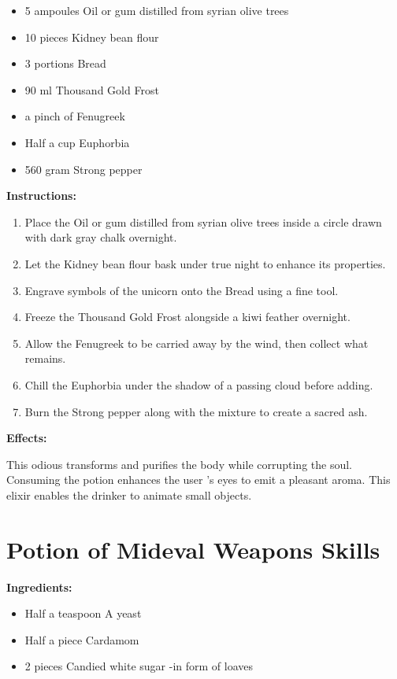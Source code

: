 \documentclass{article}
\begin{document}
\begin{itemize}
  \item 5 ampoules Oil or gum distilled from syrian olive trees
  \item 10 pieces Kidney bean flour
  \item 3 portions Bread
  \item 90 ml Thousand Gold Frost
  \item a pinch of Fenugreek
  \item Half a cup Euphorbia
  \item 560 gram Strong pepper
\end{itemize}

\textbf{Instructions:}

\begin{enumerate}
  \item Place the Oil or gum distilled from syrian olive trees inside a circle drawn with dark gray chalk overnight.
  \item Let the Kidney bean flour bask under true night to enhance its properties.
  \item Engrave symbols of the unicorn onto the Bread using a fine tool.
  \item Freeze the Thousand Gold Frost alongside a kiwi feather overnight.
  \item Allow the Fenugreek to be carried away by the wind, then collect what remains.
  \item Chill the Euphorbia under the shadow of a passing cloud before adding.
  \item Burn the Strong pepper along with the mixture to create a sacred ash.
\end{enumerate}

\textbf{Effects:}

This odious transforms and purifies the body while corrupting the soul. Consuming the potion enhances the user 's eyes to emit a pleasant aroma. This elixir enables the drinker to animate small objects.

\newpage
\section*{Potion of Mideval Weapons Skills}

\textbf{Ingredients:}

\begin{itemize}
  \item Half a teaspoon A yeast
  \item Half a piece Cardamom
  \item 2 pieces Candied white sugar -in form of loaves
\end{itemize}
\end{document}
